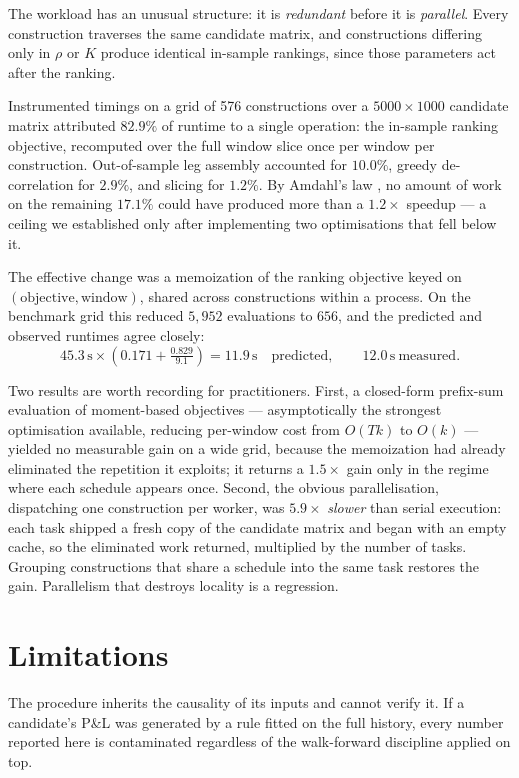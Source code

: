 \documentclass[11pt,a4paper]{article}
\begin{document}
The workload has an unusual structure: it is \emph{redundant} before it is
\emph{parallel}. Every construction traverses the same candidate matrix, and
constructions differing only in $\rho$ or $K$ produce identical in-sample
rankings, since those parameters act after the ranking.

Instrumented timings on a grid of 576 constructions over a $5000 \times 1000$
candidate matrix attributed $82.9\%$ of runtime to a single operation: the
in-sample ranking objective, recomputed over the full window slice once per
window per construction. Out-of-sample leg assembly accounted for $10.0\%$,
greedy de-correlation for $2.9\%$, and slicing for $1.2\%$. By Amdahl's law
\cite{amdahl1967}, no amount of work on the remaining $17.1\%$ could have
produced more than a $1.2\times$ speedup --- a ceiling we established only after
implementing two optimisations that fell below it.

The effective change was a memoization of the ranking objective keyed on
$(\text{objective}, \text{window})$, shared across constructions within a
process. On the benchmark grid this reduced $5{,}952$ evaluations to $656$, and
the predicted and observed runtimes agree closely:
\[
45.3\,\text{s} \times \left(0.171 + \tfrac{0.829}{9.1}\right) = 11.9\,\text{s}
\quad\text{predicted},\qquad 12.0\,\text{s}\ \text{measured}.
\]

Two results are worth recording for practitioners. First, a closed-form
prefix-sum evaluation of moment-based objectives --- asymptotically the
strongest optimisation available, reducing per-window cost from $O(Tk)$ to
$O(k)$ --- yielded no measurable gain on a wide grid, because the memoization
had already eliminated the repetition it exploits; it returns a $1.5\times$
gain only in the regime where each schedule appears once. Second, the obvious
parallelisation, dispatching one construction per worker, was $5.9\times$
\emph{slower} than serial execution: each task shipped a fresh copy of the
candidate matrix and began with an empty cache, so the eliminated work returned,
multiplied by the number of tasks. Grouping constructions that share a schedule
into the same task restores the gain. Parallelism that destroys locality is a
regression.

\section{Limitations}

The procedure inherits the causality of its inputs and cannot verify it. If a
candidate's P\&L was generated by a rule fitted on the full history, every
number reported here is contaminated regardless of the walk-forward discipline
applied on top.
\end{document}
